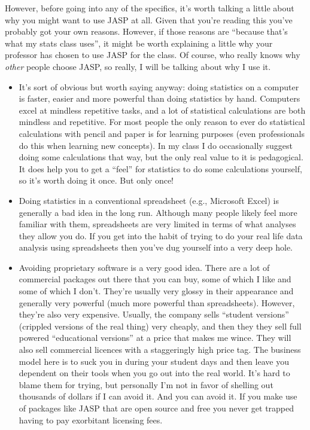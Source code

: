 However, before going into any of the specifics, it's worth talking a little about why you might want to use JASP at all. Given that you're reading this you've probably got your own reasons. However, if those reasons are ``because that's what my stats class uses'', it might be worth explaining a little why your professor has chosen to use JASP for the class. Of course, who really knows why {\it other} people choose JASP, so really, I will be talking about why I use it.
\begin{itemize}
\item It's sort of obvious but worth saying anyway: doing statistics on a computer is faster, easier and more powerful than doing statistics by hand. Computers excel at mindless repetitive tasks, and a lot of statistical calculations are both mindless and repetitive. For most people the only reason to ever do statistical calculations with pencil and paper is for learning purposes (even professionals do this when learning new concepts). In my class I do occasionally suggest doing some calculations that way, but the only real value to it is pedagogical. It does help you to get a ``feel'' for statistics to do some calculations yourself, so it's worth doing it once. But only once!
\item Doing statistics in a conventional spreadsheet (e.g., Microsoft Excel) is generally a bad idea in the long run. Although many people likely feel more familiar with them, spreadsheets are very limited in terms of what analyses they allow you do. If you get into the habit of trying to do your real life data analysis using spreadsheets then you've dug yourself into a very deep hole.
\item Avoiding proprietary software is a very good idea. There are a lot of commercial packages out there that you can buy, some of which I like and some of which I don't. They're usually very glossy in their appearance and generally very powerful (much more powerful than spreadsheets). However, they're also very expensive. Usually, the company sells ``student versions'' (crippled versions of the real thing) very cheaply, and then they they sell full powered ``educational versions'' at a price that makes me wince. They will also sell commercial licences with a staggeringly high price tag. The business model here is to suck you in during your student days and then leave you dependent on their tools when you go out into the real world. It's hard to blame them for trying, but personally I'm not in favor of shelling out thousands of dollars if I can avoid it. And you can avoid it. If you make use of packages like JASP that are open source and free you never get trapped having to pay exorbitant licensing fees. 
\end{itemize}


